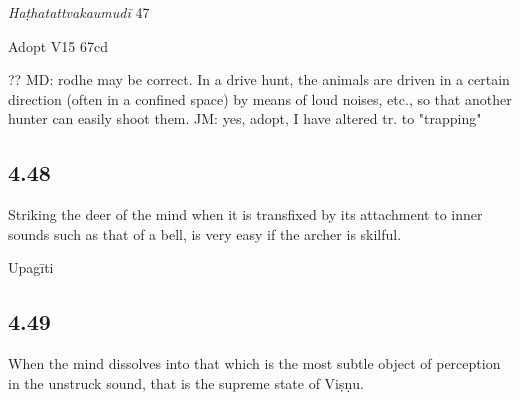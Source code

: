 \begin{ekdosis}
\begin{testimonia}[hp04_047_1]
\emph{Haṭhatattvakaumudī} 47
\begin{versinnote}
\end{versinnote}
\end{testimonia}

\begin{philcomm}[hp04_047_1]
Adopt V15 67cd

?? MD: rodhe may be correct. In a drive hunt, the animals are driven in a certain direction (often in a confined space)  by means of loud noises, etc., so that another hunter can easily shoot them. JM: yes, adopt, I have altered tr. to "trapping"
\end{philcomm}



\subsection*{4.48}
\begin{translation}[hp04_048]
Striking the deer of the mind when it is transfixed by its attachment to inner sounds such as that of a bell, is very easy if the archer is skilful.
\end{translation}
%




\begin{metre}[hp04_048]
Upagīti 
\end{metre}


\subsection*{4.49}
\begin{translation}[hp04_049]
When the mind dissolves into that which is the most subtle object of perception in the unstruck sound, that is the supreme state of Viṣṇu.


\end{translation}
\end{ekdosis}
